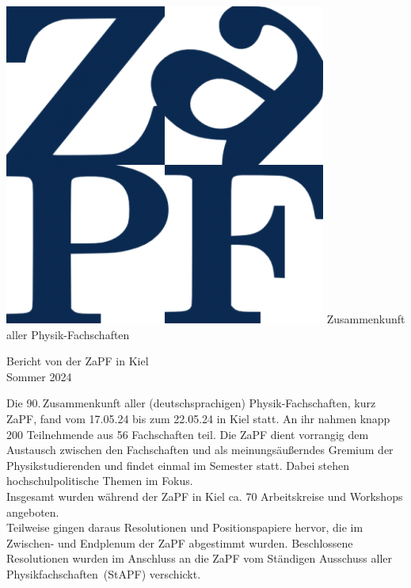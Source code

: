 \documentclass{scrartcl}
\begin{document}
\hspace{0.74\textwidth}
\begin{minipage}{0.25\textwidth}
      \vspace{-1cm}
      \centering
      \includegraphics[width=.89\textwidth]{logo.png}
      \small Zusammenkunft aller Physik-Fachschaften
\end{minipage}

\begin{center}
      \vspace{1.5cm}
      \huge{Bericht von der ZaPF in Kiel \\ Sommer 2024}
      \vspace{1cm}
\end{center}

Die 90.\,Zusammenkunft aller (deutschsprachigen) Physik-Fachschaften, kurz ZaPF, fand vom 17.05.24 bis zum 22.05.24 in Kiel statt. An ihr nahmen knapp 200 Teilnehmende aus 56 Fachschaften teil.
Die ZaPF dient vorrangig dem Austausch zwischen den Fachschaften und als meinungsäußerndes Gremium der Physikstudierenden und findet einmal im Semester statt. Dabei stehen hochschulpolitische Themen im Fokus.\\
Insgesamt wurden während der ZaPF in Kiel ca. 70 Arbeitskreise und Workshops angeboten.\\
Teilweise gingen daraus Resolutionen und Positionspapiere hervor, die im Zwischen- und Endplenum der ZaPF abgestimmt wurden. Beschlossene Resolutionen wurden im Anschluss an die ZaPF vom Ständigen Ausschuss aller Physikfachschaften~(StAPF) verschickt.
\end{document}
